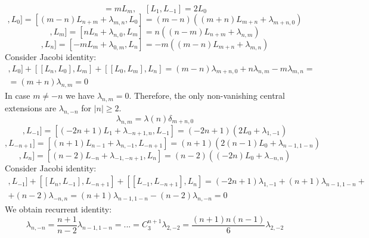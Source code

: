 \documentclass[12pt]{article}
\theoremstyle{definition}
\begin{document}
\begin{enumerate}
\begin{itemize}
    \begin{equation}
        [L_m,L_0]=mL_m,\quad[L_1,L_{-1}]=2L_0
    \end{equation}
    \begin{equation}
        [[L_m,L_n],L_0]=[(m-n)L_{n+m}+\lambda_{m,n},L_0]=(m-n)((m+n)L_{m+n}+\lambda_{m+n,0})
    \end{equation}
    \begin{equation}
        [[L_n,L_0],L_m]=[nL_n+\lambda_{n,0},L_m]=n((n-m)L_{n+m}+\lambda_{n,m})
    \end{equation}
    \begin{equation}
        [[L_0,L_m],L_n]=[-mL_m+\lambda_{0,m},L_n]=-m((m-n)L_{m+n}+\lambda_{m,n})
    \end{equation}
    Consider Jacobi identity:
    \begin{multline}
        [[L_m,L_n],L_0]+[[L_n,L_0],L_m]+[[L_0,L_m],L_n]=(m-n)\lambda_{m+n,0}+n\lambda_{n,m}-m\lambda_{m,n}=\\=(m+n)\lambda_{n,m}=0
    \end{multline}
    In case $m\neq-n$ we have $\lambda_{n,m}=0$. Therefore, the only non-vanishing central extensions are $\lambda_{n,-n}$ for $|n|\geq2$.
    \begin{equation}
        \lambda_{n,m}=\lambda(n)\delta_{m+n,0}
    \end{equation}
    \begin{equation}
        [[L_{-n+1},L_n],L_{-1}]=[(-2n+1)L_1+\lambda_{-n+1,n},L_{-1}]=(-2n+1)(2L_0+\lambda_{1,-1})
    \end{equation}
    \begin{equation}
        [[L_n,L_{-1}],L_{-n+1}]=[(n+1)L_{n-1}+\lambda_{n,-1},L_{-n+1}]=(n+1)(2(n-1)L_0+\lambda_{n-1,1-n})
    \end{equation}
    \begin{equation}
        [[L_{-1},L_{-n+1}],L_n]=[(n-2)L_{-n}+\lambda_{-1,-n+1},L_n]=(n-2)((-2n)L_0+\lambda_{-n,n})
    \end{equation}
    Consider Jacobi identity:
    \begin{multline}
        [[L_{-n+1},L_n],L_{-1}]+[[L_n,L_{-1}],L_{-n+1}]+[[L_{-1},L_{-n+1}],L_n]=(-2n+1)\lambda_{1,-1}+(n+1)\lambda_{n-1,1-n}+\\+(n-2)\lambda_{-n,n}=(n+1)\lambda_{n-1,1-n}-(n-2)\lambda_{n,-n}=0
    \end{multline}
    We obtain recurrent identity:
    \begin{equation}
        \lambda_{n,-n}=\frac{n+1}{n-2}\lambda_{n-1,1-n}=...=C^{n+1}_3\lambda_{2,-2}=\frac{(n+1)n(n-1)}{6}\lambda_{2,-2}

\end{equation}
\end{itemize}
\end{enumerate}
\end{document}
